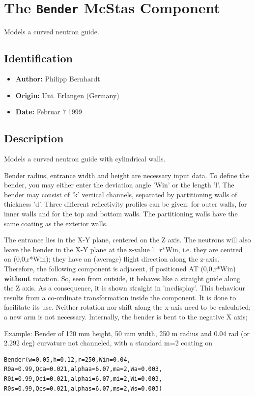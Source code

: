\section{The \texttt{Bender} McStas Component}
Models a curved neutron guide.

\subsection*{Identification}
\begin{itemize}
  \item \textbf{Author:} Philipp Bernhardt
  \item \textbf{Origin:} Uni. Erlangen (Germany)
  \item \textbf{Date:} Februar 7 1999
\end{itemize}

\subsection*{Description}
Models a curved neutron guide with cylindrical walls.

Bender radius, entrance width and height are necessary input data. To define the bender, you may either enter the deviation angle 'Win' or the length 'l'. The bender may consist of 'k' vertical channels, separated by partitioning walls of thickness 'd'. Three different reflectivity profiles can be given: for outer walls, for inner walls and for the top and bottom walls. The partitioning walls have the same coating as the exterior walls.

The entrance lies in the X-Y plane, centered on the Z axis. The neutrons will also leave the bender in the X-Y plane at the z-value l=r*Win, i.e. they are centred on (0,0,r*Win); they have an (average) flight direction along the z-axis. Therefore, the following component is adjacent, if positioned AT (0,0,r*Win) \textbf{without} rotation. So, seen from outside, it behaves like a straight guide along the Z axis. As a consequence, it is shown straight in 'mcdisplay'. This behaviour results from a co-ordinate transformation inside the component. It is done to facilitate its use. Neither rotation nor shift along the x-axis need to be calculated; a new arm is not necessary. Internally, the bender is bent to the negative X axis;

Example: Bender of 120 mm height, 50 mm width, 250 m radius and 0.04 rad (or 2.292 deg) curvature not channeled, with a standard m=2 coating on

\begin{verbatim}
Bender(w=0.05,h=0.12,r=250,Win=0.04,
R0a=0.99,Qca=0.021,alphaa=6.07,ma=2,Wa=0.003,
R0i=0.99,Qci=0.021,alphai=6.07,mi=2,Wi=0.003,
R0s=0.99,Qcs=0.021,alphas=6.07,ms=2,Ws=0.003)
\end{verbatim}

